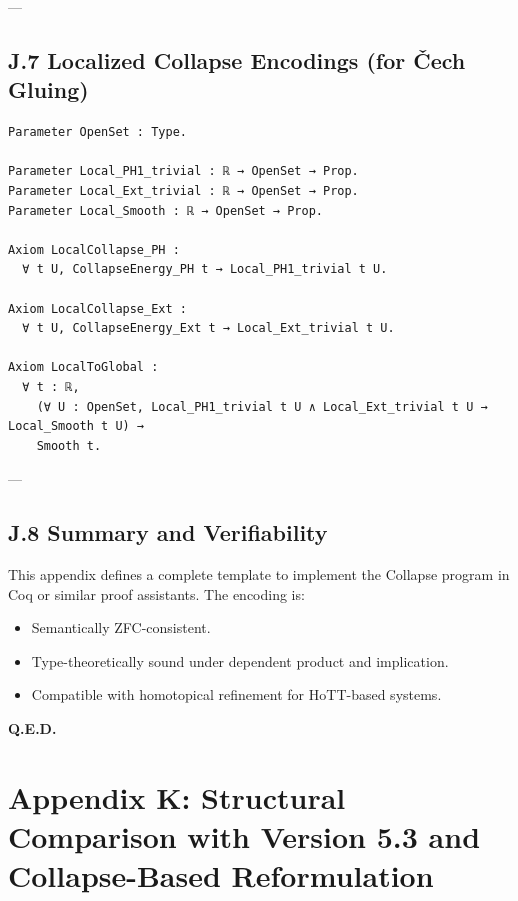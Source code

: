 \documentclass[11pt]{article}
\begin{document}
---

\subsection*{J.7 Localized Collapse Encodings (for Čech Gluing)}

\begin{lstlisting}[language=Coq]
Parameter OpenSet : Type.

Parameter Local_PH1_trivial : ℝ → OpenSet → Prop.
Parameter Local_Ext_trivial : ℝ → OpenSet → Prop.
Parameter Local_Smooth : ℝ → OpenSet → Prop.

Axiom LocalCollapse_PH :
  ∀ t U, CollapseEnergy_PH t → Local_PH1_trivial t U.

Axiom LocalCollapse_Ext :
  ∀ t U, CollapseEnergy_Ext t → Local_Ext_trivial t U.

Axiom LocalToGlobal :
  ∀ t : ℝ,
    (∀ U : OpenSet, Local_PH1_trivial t U ∧ Local_Ext_trivial t U → Local_Smooth t U) →
    Smooth t.
\end{lstlisting}

---

\subsection*{J.8 Summary and Verifiability}

This appendix defines a complete template to implement the Collapse program in Coq or similar proof assistants.  
The encoding is:
\begin{itemize}
  \item Semantically ZFC-consistent.
  \item Type-theoretically sound under dependent product and implication.
  \item Compatible with homotopical refinement for HoTT-based systems.
\end{itemize}

\begin{flushright}
\textbf{Q.E.D.}
\end{flushright}




\section*{Appendix K: Structural Comparison with Version 5.3 and Collapse-Based Reformulation}
\end{document}
